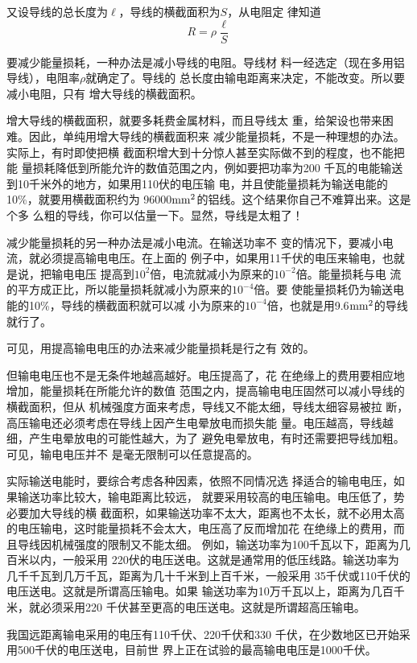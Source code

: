 又设导线的总长度为$\ell$，导线的横截面积为$S$，从电阻定
律知道
\[ R=\rho\frac{\ell}{S}\]

要减少能量损耗，一种办法是减小导线的电阻。导线材
料一经选定（现在多用铝导线），电阻率$\rho$就确定了。导线的
总长度由输电距离来决定，不能改变。所以要减小电阻，只有
增大导线的横截面积。

增大导线的横截面积，就要多耗费金属材料，而且导线太
重，给架设也带来困难。因此，单纯用增大导线的横截面积来
减少能量损耗，不是一种理想的办法。实际上，有时即使把横
截面积增大到十分惊人甚至实际做不到的程度，也不能把能
量损耗降低到所能允许的数值范围之内，例如要把功率为200
千瓦的电能输送到10千米外的地方，如果用110伏的电压输
电，并且使能量损耗为输送电能的10\%，就要用横截面积约为
96000${\rm mm}^2$的铝线。这个结果你自己不难算出来。这是个多
么粗的导线，你可以估量一下。显然，导线是太粗了！

减少能量损耗的另一种办法是减小电流。在输送功率不
变的情况下，要减小电流，就必须提高输电电压。在上面的
例子中，如果用11千伏的电压来输电，也就是说，把输电电压
提高到$10^2$倍，电流就减小为原来的$10^{-2}$倍。能量损耗与电
流的平方成正比，所以能量损耗就减小为原来的$10^{-4}$倍。要
使能量损耗仍为输送电能的10\%，导线的横截面积就可以减
小为原来的$10^{-4}$倍，也就是用9.6${\rm mm}^2$的导线就行了。

可见，用提高输电电压的办法来减少能量损耗是行之有
效的。

但输电电压也不是无条件地越高越好。电压提高了，花
在绝缘上的费用要相应地增加，能量损耗在所能允许的数值
范围之内，提高输电电压固然可以减小导线的横截面积，但从
机械强度方面来考虑，导线又不能太细，导线太细容易被拉
断，高压输电还必须考虑在导线上因产生电晕放电而损失能
量。电压越高，导线越细，产生电晕放电的可能性越大，为了
避免电晕放电，有时还需要把导线加粗。可见，输电电压并不
是毫无限制可以任意提高的。

实际输送电能时，要综合考虑各种因素，依照不同情况选
择适合的输电电压，如果输送功率比较大，输电距离比较远，
就要采用较高的电压输电。电压低了，势必要加大导线的横
截面积，如果输送功率不太大，距离也不太长，就不必用太高
的电压输电，这时能量损耗不会太大，电压高了反而增加花
在绝缘上的费用，而且导线因机械强度的限制又不能太细。
例如，输送功率为100千瓦以下，距离为几百米以内，一般采用
220伏的电压送电。这就是通常用的低压线路。输送功率为
几千千瓦到几万千瓦，距离为几十千米到上百千米，一般采用
35千伏或110千伏的电压送电。这就是所谓高压输电。如果
输送功率为10万千瓦以上，距离为几百千米，就必须采用220
千伏甚至更高的电压送电。这就是所谓超高压输电。

我国远距离输电采用的电压有110千伏、220千伏和330
千伏，在少数地区已开始采用500千伏的电压送电，目前世
界上正在试验的最高输电电压是1000千伏。

